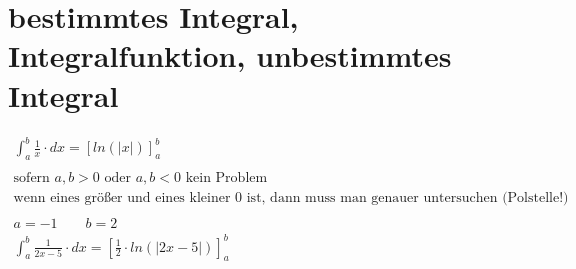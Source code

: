\section{bestimmtes Integral, Integralfunktion, unbestimmtes Integral}
\begin{gather*}
  \int_a^b \frac{1}{x} \cdot dx = \left[ln(|x|)\right]_a^b \\\\
  \text{sofern } a, b > 0 \text{ oder } a, b < 0 \text{ kein Problem} \\
  \text{wenn eines größer und eines kleiner $0$ ist, dann muss man genauer untersuchen (Polstelle!)} \\\\
  a = -1 \qquad b = 2 \\
  \int_a^b \frac{1}{2x - 5} \cdot dx = \left[\frac{1}{2} \cdot ln(|2x - 5|)\right]_a^b
\end{gather*}
